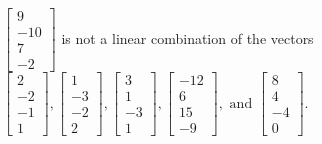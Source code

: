 \begin{exercise}
\begin{exerciseStatement}
  \end{exerciseStatement}
  \begin{exerciseAnswer}
   \(\left[\begin{array}{c}
9 \\
-10 \\
7 \\
-2
\end{array}\right]\) 
  	 is not  
	a linear combination of the vectors \(\left[\begin{array}{c}
2 \\
-2 \\
-1 \\
1
\end{array}\right] , \left[\begin{array}{c}
1 \\
-3 \\
-2 \\
2
\end{array}\right] , \left[\begin{array}{c}
3 \\
1 \\
-3 \\
1
\end{array}\right] , \left[\begin{array}{c}
-12 \\
6 \\
15 \\
-9
\end{array}\right] , \text{ and } \left[\begin{array}{c}
8 \\
4 \\
-4 \\
0
\end{array}\right]\).

	
  


  \end{exerciseAnswer}
\end{exercise}